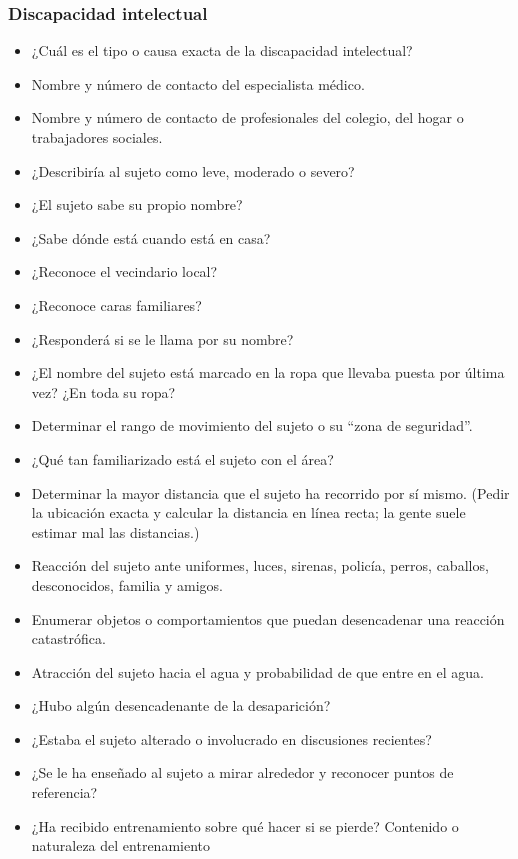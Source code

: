 \subsubsection{Discapacidad intelectual}
\begin{itemize}
    \item ¿Cuál es el tipo o causa exacta de la discapacidad intelectual?
    \item Nombre y número de contacto del especialista médico.
    \item Nombre y número de contacto de profesionales del colegio, del hogar o trabajadores sociales.
    \item ¿Describiría al sujeto como leve, moderado o severo?
    \item ¿El sujeto sabe su propio nombre?
    \item ¿Sabe dónde está cuando está en casa?
    \item ¿Reconoce el vecindario local?
    \item ¿Reconoce caras familiares?
    \item ¿Responderá si se le llama por su nombre?
    \item ¿El nombre del sujeto está marcado en la ropa que llevaba puesta por última vez? ¿En toda su ropa?
    \item Determinar el rango de movimiento del sujeto o su “zona de seguridad”.
    \item ¿Qué tan familiarizado está el sujeto con el área?
    \item Determinar la mayor distancia que el sujeto ha recorrido por sí mismo. (Pedir la ubicación exacta y calcular la distancia en línea recta; la gente suele estimar mal las distancias.)
    \item Reacción del sujeto ante uniformes, luces, sirenas, policía, perros, caballos, desconocidos, familia y amigos.
    \item Enumerar objetos o comportamientos que puedan desencadenar una reacción catastrófica.
    \item Atracción del sujeto hacia el agua y probabilidad de que entre en el agua.
    \item ¿Hubo algún desencadenante de la desaparición?
    \item ¿Estaba el sujeto alterado o involucrado en discusiones recientes?
    \item ¿Se le ha enseñado al sujeto a mirar alrededor y reconocer puntos de referencia?
    \item ¿Ha recibido entrenamiento sobre qué hacer si se pierde? Contenido o naturaleza del entrenamiento

\end{itemize}
